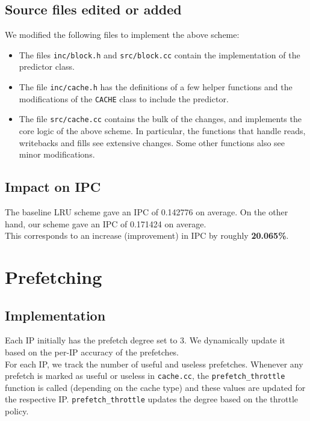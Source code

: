 \documentclass[11pt, swedish, openany]{book}
\begin{document}
\section{Source files edited or added}
We modified the following files to implement the above scheme:
\begin{itemize}
    \item The files \texttt{inc/block.h} and \texttt{src/block.cc} contain the implementation of the predictor class.
    \item The file \texttt{inc/cache.h} has the definitions of a few helper functions and the modifications of the \texttt{CACHE} class to include the predictor.
    \item The file \texttt{src/cache.cc} contains the bulk of the changes, and implements the core logic of the above scheme. In particular, the functions that handle reads, writebacks and fills see extensive changes. Some other functions also see minor modifications.
\end{itemize}

\section{Impact on IPC}
The baseline LRU scheme gave an IPC of 0.142776 on average. On the other hand, our scheme gave an IPC of 0.171424 on average.\\
This corresponds to an increase (improvement) in IPC by roughly \textbf{20.065\%}.



\chapter{Prefetching}

\section{Implementation}
Each IP initially has the prefetch degree set to $3$. We dynamically update it based on the per-IP accuracy of the prefetches.\\
For each IP, we track the number of useful and useless prefetches. Whenever any prefetch is marked as useful or useless in \texttt{cache.cc}, the \texttt{prefetch\_throttle} function is called (depending on the cache type) and these values are updated for the respective IP. \texttt{prefetch\_throttle} updates the degree based on the throttle policy.
\end{document}
